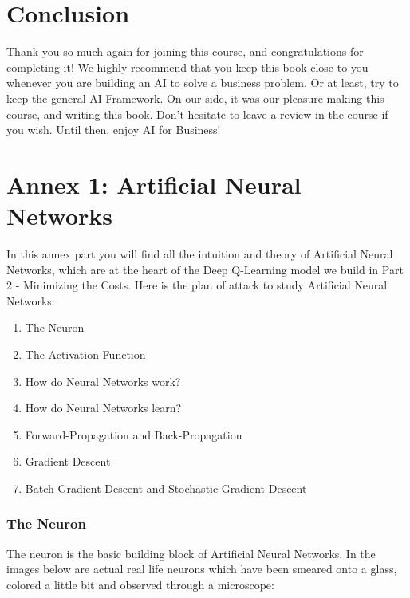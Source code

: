 \documentclass[]{book}
\begin{document}
\hypertarget{conclusion}{%
\chapter*{Conclusion}\label{conclusion}}

Thank you so much again for joining this course, and congratulations for completing it! We highly recommend that you keep this book close to you whenever you are building an AI to solve a business problem. Or at least, try to keep the general AI Framework. On our side, it was our pleasure making this course, and writing this book. Don't hesitate to leave a review in the course if you wish. Until then, enjoy AI for Business!

\hypertarget{annex-1-artificial-neural-networks}{%
\chapter{Annex 1: Artificial Neural Networks}\label{annex-1-artificial-neural-networks}}

In this annex part you will find all the intuition and theory of Artificial Neural Networks, which are at the heart of the Deep Q-Learning model we build in Part 2 - Minimizing the Costs. Here is the plan of attack to study Artificial Neural Networks:

\begin{enumerate}
    \item The Neuron
    \item The Activation Function
    \item How do Neural Networks work?
    \item How do Neural Networks learn?
    \item Forward-Propagation and Back-Propagation
    \item Gradient Descent
    \item Batch Gradient Descent and Stochastic Gradient Descent
\end{enumerate}

\subsection{The Neuron}

The neuron is the basic building block of Artificial Neural Networks. In the images below are actual real life neurons which have been smeared onto a glass, colored a little bit and observed through a microscope:
\end{document}
